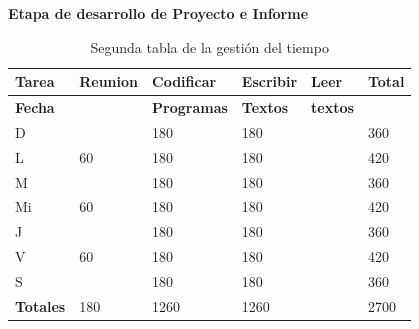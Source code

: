 \documentclass[a4paper,12pt,openany,oneside]{book}
\begin{document}
\begin{table}[!ht]
\textbf{Etapa de desarrollo de Proyecto e Informe}\\
\begin{tabular}{| l | l | l | l | l | l |}
\hline
\textbf{Tarea} & \textbf{Reunion} & \textbf{Codificar} & \textbf{Escribir} & \textbf{Leer} & \textbf{Total} \\
\hline
\textbf{Fecha} &                  & \textbf{Programas} & \textbf{Textos} & \textbf{textos} & \\
\hline
D  &    & 180 & 180 &  & 360 \\
\hline
L  & 60 & 180 & 180 &  & 420 \\
\hline
M  &    & 180 & 180 &  & 360 \\
\hline
Mi & 60 & 180 & 180 &  & 420 \\
\hline
J  &    & 180 & 180 &  & 360 \\
\hline
V  & 60 & 180 & 180 &  & 420 \\
\hline
S  &    & 180 & 180 &  & 360 \\
\hline
\textbf{Totales} & 180 & 1260 & 1260 &  & 2700 \\
\hline
\end{tabular}
\caption{Segunda tabla de la gestión del tiempo}
\end{table}
\end{document}
